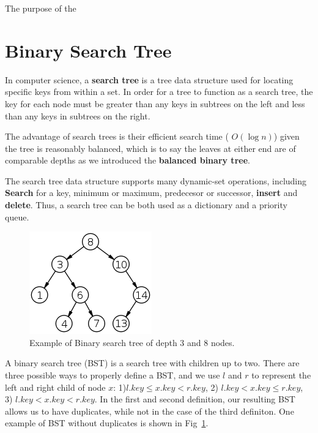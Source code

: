 \documentclass[../main.tex]{subfiles}
\begin{document}
The purpose of the
\section{Binary Search Tree}
\label{sec_binary_search_tree}
 In computer science, a \textbf{search tree} is a tree data structure used for locating specific keys from within a set. In order for a tree to function as a search tree, the key for each node must be greater than any keys in subtrees on the left and less than any keys in subtrees on the right. 

The advantage of search trees is their efficient search time ( $O(\log n)$) given the tree is reasonably balanced, which is to say the leaves at either end are of comparable depths as we introduced the \textbf{balanced binary tree}. 

The search tree data structure supports many dynamic-set operations, including \textbf{Search} for a key, minimum or maximum, predecesor or successor, \textbf{insert} and \textbf{delete}. Thus, a search tree can be both used as a dictionary and a priority queue.
\begin{figure}[!ht]
    \centering
    \includegraphics[width = 0.4\columnwidth]{fig/Binary_search_tree.png}
    \caption{Example of Binary search tree of depth 3 and 8 nodes.}
    \label{fig:bst}
\end{figure}



A binary search tree (BST) is a search tree with children up to two.  There are three possible ways to properly define a BST, and we use $l$ and $r$ to represent the left and right child of node $x$: 1)$l.key \leq x.key < r.key$, 2) $l.key  < x.key \leq r.key$, 3) $l.key < x.key < r.key$. In the first and second definition, our resulting BST allows us to have duplicates, while not in the case of the third definiton. One example of BST without duplicates is shown in Fig~\ref{fig:bst}. 
\end{document}
